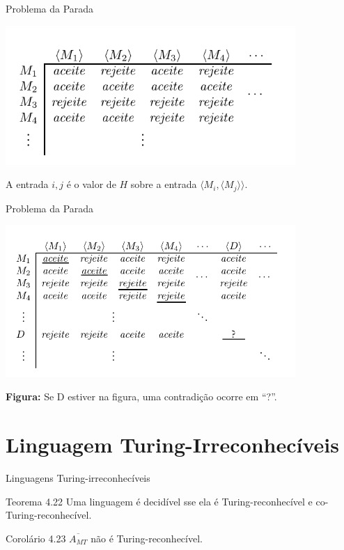 \documentclass[xcolor=dvipsnames,table]{beamer}
\begin{document}
	\begin{frame}{Problema da Parada}
		\begin{center}
			\includegraphics[width=11cm]{images/h.png}
			
			 A entrada $i,j$ é o valor de $H$ sobre a entrada $\langle M_i , \langle M_j \rangle \rangle$.
		\end{center}
	\end{frame}

	\begin{frame}{Problema da Parada}
		\begin{center}
			\includegraphics[width=11cm]{images/d.png}
			
			{\bf Figura:} Se D estiver na figura, uma contradição ocorre em ``?''.
		\end{center}
	\end{frame}

	\section{Linguagem Turing-Irreconhecíveis}
	\begin{frame}{Linguagens Turing-irreconhecíveis}
		\begin{block}{Teorema 4.22}
			Uma linguagem é decidível sse ela é Turing-reconhecível e co-Turing-reconhecível.
		\end{block} \pause
		\begin{block}{Corolário 4.23}
			$\overline{A_{MT}}$ não é Turing-reconhecível.
		\end{block}
	\end{frame}
	
	\begin{frame}
		\titlepage
	\end{frame}
	
\end{document}
